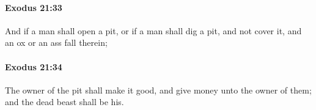 		\paragraph{Exodus 21:33} %
			\label{EXODUS-21-33}

			And if a man shall open a pit, or if a man shall dig a pit, and not cover it, and an ox or an ass fall therein;


		\paragraph{Exodus 21:34} %
			\label{EXODUS-21-34}

			The owner of the pit shall make it good, and give money unto the owner of them; and the dead beast shall be his.


